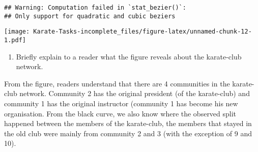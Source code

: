 \documentclass[
]{article}
\providecommand{\tightlist}{%
  \setlength{\itemsep}{0pt}\setlength{\parskip}{0pt}}
\begin{document}
\begin{verbatim}
## Warning: Computation failed in `stat_bezier()`:
## Only support for quadratic and cubic beziers
\end{verbatim}

\texttt{[image: Karate-Tasks-incomplete\_files/figure-latex/unnamed-chunk-12-1.pdf]}

\begin{enumerate}
\def\labelenumi{(\arabic{enumi})}
\setcounter{enumi}{11}
\tightlist
\item
  Briefly explain to a reader what the figure reveals about the
  karate-club network.
\end{enumerate}

\Ans From the figure, readers understand that there are 4 communities in
the karate-club network. Community 2 has the original president (of the
karate-club) and community 1 has the original instructor (community 1
has become his new organisation. From the black curve, we also know
where the observed split happened between the members of the
karate-club, the members that stayed in the old club were mainly from
community 2 and 3 (with the exception of 9 and 10).
\end{document}
